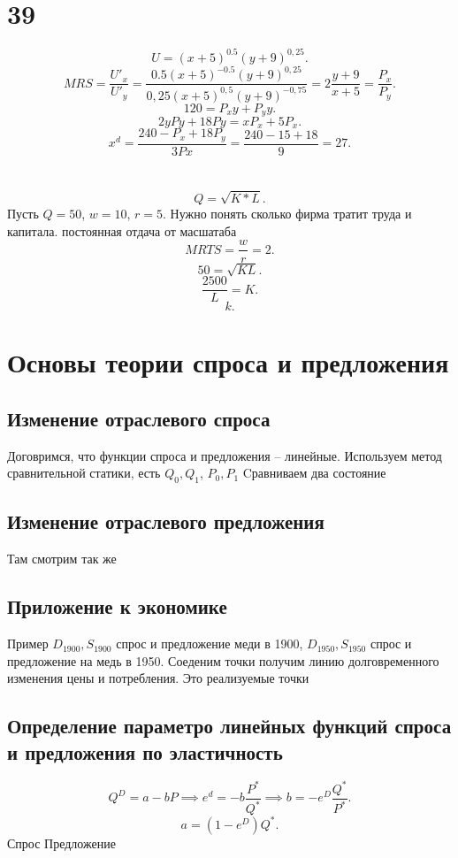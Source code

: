\documentclass[14pt]{extarticle}
\begin{document}
\section{39}
\[
U = (x + 5)^{0.5} (y + 9)^{0,25}
.\] 
\[
MRS = \frac{U'_{x}}{U'_{y}} = \frac{0.5 (x + 5)^{-0.5} (y + 9)^{0,25}}{0,25 (x + 5)^{0,5} (y + 9)^{-0,75}} = 2 \frac{y + 9}{x + 5} = \frac{P_{x}}{P_{y}}
.\] 
\[
120 = P_{x} y + P_{y} y
.\] 
\[
2 y Py + 18 Py =  x P_{x} + 5P_{x}
.\] 
\[
x^{d} = \frac{240 - P_{x} + 18P_{y}}{3Px} = \frac{240 - 15 + 18}{9} = 27
.\] 
\section{}
\[
    Q = \sqrt{K * L} 
.\] 
Пусть $Q = 50$,  $w = 10$,  $r = 5$. Нужно понять сколько фирма тратит труда и капитала. постоянная отдача от масшатаба
\[
MRTS = \frac{w}{r} = 2
.\] 
\[
50 = \sqrt{KL} 
.\] 
\[
\frac{2500}{L} = K
.\] 
\[
k
.\] 
\section{Основы теории спроса и предложения}
\subsection{Изменение отраслевого спроса}
Договримся, что функции спроса и предложения -- линейные. Используем метод сравнительной статики, есть $Q_0,Q_1$, $P_0,P_1$ Cравниваем два состояние
\subsection{Изменение отраслевого предложения}
Там смотрим так же
\subsection{Приложение к экономике}
Пример $D_{1900},S_{1900}$ спрос и предложение меди в 1900, $D_{1950},S_{1950}$ спрос и предложение на медь в 1950. Соеденим точки получим линию долговременного изменения цены и потребления. Это реализуемые точки
\subsection{Определение параметро линейных функций спроса и предложения по эластичность}
\[
Q^{D} = a- bP \implies e^{d} = -b \frac{P^{*}}{Q^{*}} \implies b =-e^{D} \frac{Q^{*}}{P^{*}}
.\] 
\[
a = (1 - e^{D})Q^{*}
.\] 
Спрос
Предложение
\end{document}
